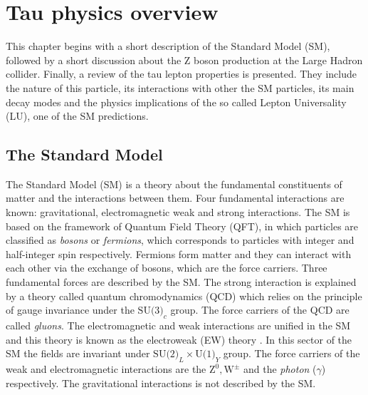 \chapter{Tau physics overview}\label{chap:relatedwork}
This chapter begins with a short description of the Standard Model (SM), followed by a short discussion about the Z boson production at the Large Hadron collider. Finally, a review of the tau lepton properties is presented. They include the nature of this particle, its interactions with other the SM particles, its main decay modes and the physics implications of the so called Lepton Universality (LU), one of the SM predictions.  
\section{The Standard Model}\label{chap2secm1}
The Standard Model (SM) is a theory about the fundamental constituents of matter and the interactions between them. Four fundamental interactions are known: gravitational, electromagnetic weak and strong interactions. The SM is based on the framework of Quantum Field Theory (QFT), in which particles are classified as \textit{bosons} or \textit{fermions}, which corresponds to particles with integer and half-integer spin respectively. Fermions form matter and they can interact with each other via the exchange of bosons, which are the force carriers. Three fundamental forces are described by the SM. The strong interaction is explained by a theory called quantum chromodynamics (QCD) \cite{GellMann:1964nj} which relies on the principle of gauge invariance under the $\text{SU(3)}_c$ group. The force carriers of the QCD are called \textit{gluons}. The electromagnetic and weak interactions are unified in the SM and this theory is known as the electroweak (EW) theory \cite{Glashow:1967rx,Salam:1968rm,Weinberg:1967tq}. In this sector of the SM the fields are invariant under $\text{SU(2)}_L\times\text{U(1)}_Y$ group. The force carriers of the weak and electromagnetic interactions are the $\text{Z}^0,\text{W}^\pm$ and the \textit{photon} ($\gamma$) respectively. The gravitational interactions is not described by the SM.
	
